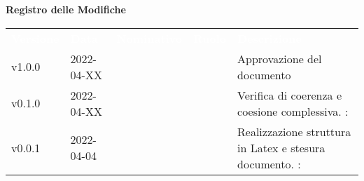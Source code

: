

{\LARGE{\textbf{Registro delle Modifiche}}} \\
\begin{table}[!htbp]
	\renewcommand{\arraystretch}{1.5}
	\begin{tabular}{ m{}<{\centering}  m{}<{\centering}  m{}<{\centering}  m{}<{\centering}  m{}<{\centering} }
		\rowcolor{darkblue}
		\textcolor{white}{\textbf{Versione}} & \textcolor{white}{\textbf{Data}} & \textcolor{white}{\textbf{Nominativo}} & \textcolor{white}{\textbf{Ruolo}} & \textcolor{white}{\textbf{Descrizione}}                              \\
		v1.0.0                               & 2022-04-XX                       &                                        & \RE                               & Approvazione del documento                                           \\

		v0.1.0                               & 2022-04-XX                       & \PV                                    & \AN                               & Verifica di coerenza e coesione complessiva. \VE: \textit{}          \\

		v0.0.1                               & 2022-04-04                       & \PV                                    & \AN                               & Realizzazione struttura in Latex e stesura documento. \VE: \textit{} \\
	\end{tabular}
\end{table}

\pagebreak
